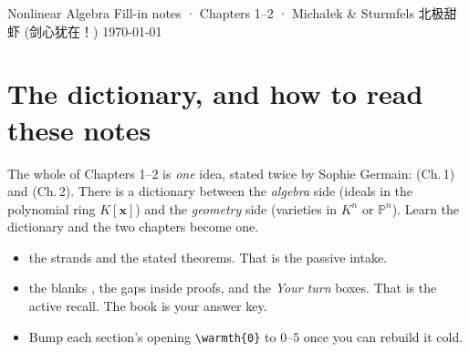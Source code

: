 \documentclass[cjk]{loom}   %
\newcommand{\PP}{\mathbb{P}}
\newcommand{\xb}{\mathbf{x}}
\begin{document}
\loomcover
  {Nonlinear Algebra}
  {Fill-in notes · Chapters 1--2 · Michałek \& Sturmfels}
  {北极甜虾 (剑心犹在！)}
  {\today}

\section*{The dictionary, and how to read these notes}

\begin{strand}
The whole of Chapters 1--2 is \emph{one} idea, stated twice by Sophie Germain:
 (Ch.\,1) and
 (Ch.\,2). There is a dictionary
between the \emph{algebra} side (ideals in the polynomial ring $K[\xb]$) and the
\emph{geometry} side (varieties in $K^n$ or $\PP^n$). Learn the dictionary and
the two chapters become one.
\end{strand}

\begin{itemize}[leftmargin=1.3em,itemsep=1pt]
  \item {} the strands and the stated theorems. That is the passive intake.
  \item {} the blanks \fillin[1.2cm], the  gaps inside proofs,
        and the \emph{Your turn} boxes. That is the active recall. The book is your answer key.
  \item Bump each section's opening \texttt{\textbackslash warmth\{0\}} to $0$--$5$ once you can rebuild it cold.
\end{itemize}
\end{document}
